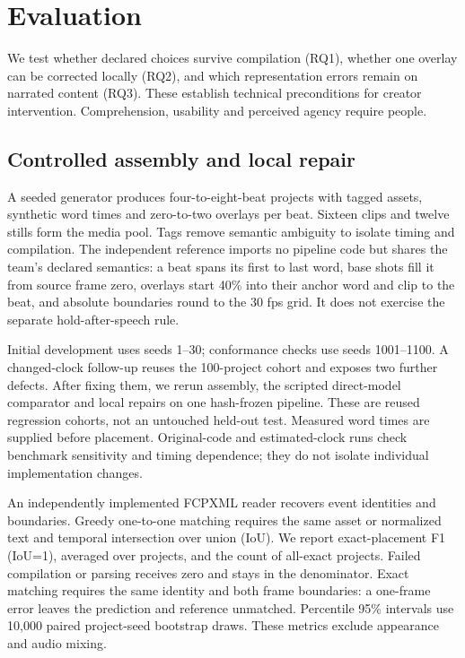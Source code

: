 \documentclass{ceurart}
\begin{document}
\section{Evaluation}\label{evaluation}

We test whether declared choices survive compilation (RQ1), whether one
overlay can be corrected locally (RQ2), and which representation errors
remain on narrated content (RQ3). These establish technical
preconditions for creator intervention. Comprehension, usability and
perceived agency require people.

\subsection{Controlled assembly and local
repair}\label{controlled-assembly-and-local-repair}

A seeded generator produces four-to-eight-beat projects with tagged
assets, synthetic word times and zero-to-two overlays per beat. Sixteen
clips and twelve stills form the media pool. Tags remove semantic
ambiguity to isolate timing and compilation. The independent reference
imports no pipeline code but shares the team's declared semantics: a
beat spans its first to last word, base shots fill it from source frame
zero, overlays start 40\% into their anchor word and clip to the beat,
and absolute boundaries round to the 30 fps grid. It does not exercise
the separate hold-after-speech rule.

Initial development uses seeds 1--30; conformance checks use seeds
1001--1100. A changed-clock follow-up reuses the 100-project cohort and
exposes two further defects. After fixing them, we rerun assembly, the
scripted direct-model comparator and local repairs on one hash-frozen
pipeline. These are reused regression cohorts, not an untouched held-out
test. Measured word times are supplied before placement. Original-code
and estimated-clock runs check benchmark sensitivity and timing
dependence; they do not isolate individual implementation changes.

An independently implemented FCPXML reader recovers event identities and
boundaries. Greedy one-to-one matching requires the same asset or
normalized text and temporal intersection over union (IoU). We report
exact-placement F1 (IoU=1), averaged over projects, and the count of
all-exact projects. Failed compilation or parsing receives zero and
stays in the denominator. Exact matching requires the same identity and
both frame boundaries: a one-frame error leaves the prediction and
reference unmatched. Percentile 95\% intervals use 10,000 paired
project-seed bootstrap draws. These metrics exclude appearance and audio
mixing.
\end{document}
